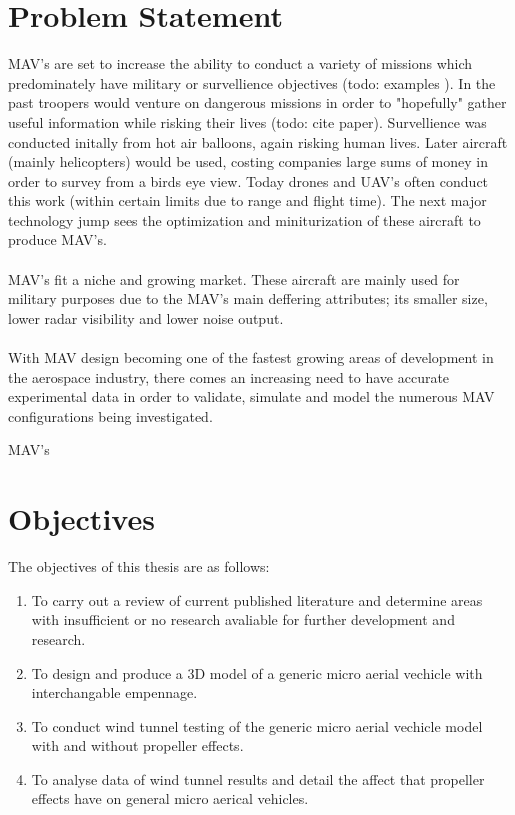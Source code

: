 \section{Problem Statement}
\label{ProblemStatement}
MAV's are set to increase the ability to conduct a variety of missions which predominately have military or survellience objectives (todo: examples ). In the past troopers would venture on dangerous missions in order to "hopefully" gather useful information while risking their lives (todo: cite paper). Survellience was conducted initally from hot air balloons, again risking human lives. Later aircraft (mainly helicopters) would be used, costing companies large sums of money in order to survey from a birds eye view. Today drones and UAV's often conduct this work (within certain limits due to range and flight time). The next major technology jump sees the optimization and miniturization of these aircraft to produce MAV's. \\
\\
MAV's fit a niche and growing market. These aircraft are mainly used for military purposes due to the MAV's main deffering attributes; its smaller size, lower radar visibility and lower noise output.\\
\\
With MAV design becoming one of the fastest growing areas of development in the aerospace industry, there comes an increasing need to have accurate experimental data in order to validate, simulate and model the numerous MAV configurations being investigated. 

MAV's




\section{Objectives}
\label{sec:Objectives}
The objectives of this thesis are as follows:

\begin{enumerate}
  \item To carry out a review of current published literature and determine areas with insufficient or no research avaliable for further development and research.
  \item To design and produce a 3D model of a generic micro aerial vechicle with interchangable empennage.
  \item To conduct wind tunnel testing of the generic micro aerial vechicle model with and without propeller effects.
  \item To analyse data of wind tunnel results and detail the affect that propeller effects have on general micro aerical vehicles.
\end{enumerate}

